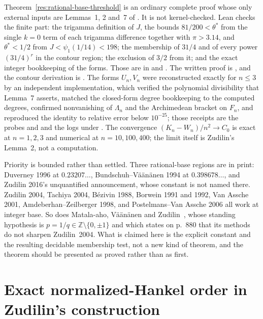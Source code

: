 \documentclass[11pt]{article}
\begin{document}
Theorem~\ref{res:rational-base-threshold} is an ordinary complete proof whose
only external inputs are Lemmas~1, 2 and~7 of \cite{zudilin2004}.  It is not
kernel-checked.  Lean checks the finite part: the trigamma definition of $J$,
the bounds $81/200<\theta^*$ from the single $k=0$ term of each trigamma
difference together with $\pi>3.14$, and $\theta^*<1/2$ from
$J<\psi_1(1/14)<198$; the membership of $31/4$ and of every power
$(31/4)^r$ in the contour region; the exclusion of $3/2$ from it; and the exact
integer bookkeeping of the forms.  Those are in
 and
.  The written proof is
, and the
contour derivation is
.  The
forms $U_n,V_n$ were reconstructed exactly for $n\le3$ by an independent
implementation, which verified the polynomial divisibility that Lemma~7
asserts, matched the closed-form degree bookkeeping to the computed degrees,
confirmed nonvanishing of $\Lambda_n$ and the Archimedean bracket on
$F_n$, and reproduced the identity to relative error below $10^{-25}$;
those receipts are the probes
 and
 and the logs under
.
The convergence $(K_n-W_n)/n^2\to C_0$ is exact at $n=1,2,3$ and numerical at
$n=10,100,400$; the limit itself is Zudilin's Lemma~2, not a computation.

Priority is bounded rather than settled.  Three rational-base regions are in
print: Duverney 1996 at $0.23207\ldots$, Bundschuh--V\"a\"an\"anen 1994 at
$0.398678\ldots$, and Zudilin 2016's unquantified announcement, whose constant
is not named there.  Zudilin 2004, Tachiya 2004, B\'ezivin 1988, Borwein 1991
and 1992, Van Assche 2001, Amdeberhan--Zeilberger 1998, and
Postelmans--Van Assche 2006 all work at integer base.  So does
Matala-aho, V\"a\"an\"anen and Zudilin~\cite{mvz2006}, whose standing
hypothesis is $p=1/q\in\mathbb Z\setminus\{0,\pm1\}$ and which states on p.~880
that its methods do not sharpen Zudilin~2004.  What is claimed here is
the explicit constant and the resulting decidable membership test, not a new
kind of theorem, and the theorem should be presented as proved rather than as
first.

\section{Exact normalized-Hankel order in Zudilin's construction}
\label{sec:hankel-order}
\end{document}
